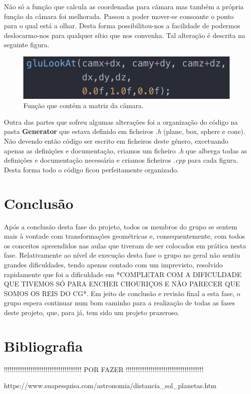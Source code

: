 \documentclass[a4paper]{article}
\begin{document}
Não só a função que calcula as coordenadas para câmara mas também a própria função da câmara foi melhorada. Passou a poder mover-se consoante o ponto para o qual está a olhar. Desta forma possibilitou-nos a facilidade de podermos deslocarmo-nos para qualquer sítio que nos convenha. Tal alteração é descrita na seguinte figura.

\begin{figure}[H]
\centering
\includegraphics[scale=0.9]{mat_camara.png}
\caption{Função que contém a matriz da câmara.}
\label{img:mat_camara}
\end{figure}

Outra das partes que sofreu algumas alterações foi a organização do código na pasta \textbf{Generator} que estava definido em ficheiros \emph{.h} (plane, box, sphere e cone). Não devendo então código ser escrito em ficheiros deste género, excetuando apenas as definições e documentação, criamos um ficheiro \emph{.h} que alberga todas as definições e documentação necessária e criamos ficheiros \emph{.cpp} para cada figura. Desta forma todo o código ficou perfeitamente organizado.

\newpage

\section{Conclusão}
\label{sec:conclusao}

Após a conclusão desta fase do projeto, todos os membros do grupo se sentem mais à vontade com transformações geométricas e, consequentemente, com todos os conceitos apreendidos nas aulas que tiveram de ser colocados em prática nesta fase. Relativamente ao nível de execução desta fase o grupo no geral não sentiu grandes dificuldades, tendo apenas contado com um imprevisto, resolvido rapidamente que foi a dificuldade em *COMPLETAR COM A DIFICULDADE QUE TIVEMOS SÓ PARA ENCHER CHOURIÇOS E NÃO PARECER QUE SOMOS OS REIS DO CG*.
Em jeito de conclusão e revisão final a esta fase, o grupo espera continuar num bom caminho para a realização de todas as fases deste projeto, que, para já, tem sido um projeto prazeroso.

\section{Bibliografia}
\label{sec:bibliografia}

!!!!!!!!!!!!!!!!!!!!!!!!!!!!!!!!!!!!!!!!! POR FAZER !!!!!!!!!!!!!!!!!!!!!!!!!!!!!!!!!!!!!!!!!

https://www.suapesquisa.com/astronomia/distancia\_sol\_planetas.htm
\end{document}
